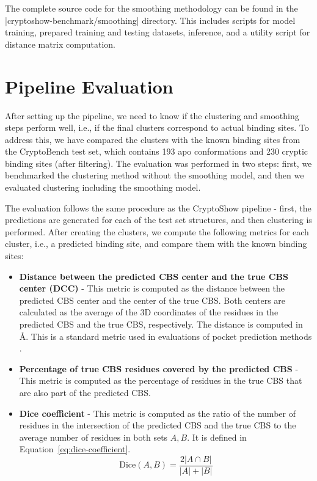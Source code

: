The complete source code for the smoothing methodology can be found in the \inline|cryptoshow-benchmark/smoothing| directory. This includes scripts for model training, prepared training and testing datasets, inference, and a utility script for distance matrix computation.

\section{Pipeline Evaluation}
\label{sec:pipeline-evaluation}

After setting up the pipeline, we need to know if the clustering and smoothing steps perform well, i.e., if the final clusters correspond to actual binding sites. To address this, we have compared the clusters with the known binding sites from the CryptoBench test set, which contains 193 apo conformations and 230 cryptic binding sites (after filtering). The evaluation was performed in two steps: first, we benchmarked the clustering method without the smoothing model, and then we evaluated clustering including the smoothing model.

The evaluation follows the same procedure as the CryptoShow pipeline - first, the predictions are generated for each of the test set structures, and then clustering is performed. After creating the clusters, we compute the following metrics for each cluster, i.e., a predicted binding site, and compare them with the known binding sites:

\begin{itemize}
    \item \textbf{Distance between the predicted CBS center and the true CBS center (DCC)} - This metric is computed as the distance between the predicted CBS center and the center of the true CBS. Both centers are calculated as the average of the 3D coordinates of the residues in the predicted CBS and the true CBS, respectively. The distance is computed in \AA. This is a standard metric used in evaluations of pocket prediction methods \cite{kandel2021puresnet}.
    \item \textbf{Percentage of true CBS residues covered by the predicted CBS} - This metric is computed as the percentage of residues in the true CBS that are also part of the predicted CBS.
    \item \textbf{Dice coefficient} - This metric is computed as the ratio of the number of residues in the intersection of the predicted CBS and the true CBS to the average number of residues in both sets $A, B$. It is defined in Equation~\ref{eq:dice-coefficient}.
    \begin{equation}
        \text{Dice}(A, B) = \frac{2 |A \cap B|}{|A| + |B|}
        \label{eq:dice-coefficient}
    \end{equation}
\end{itemize}

